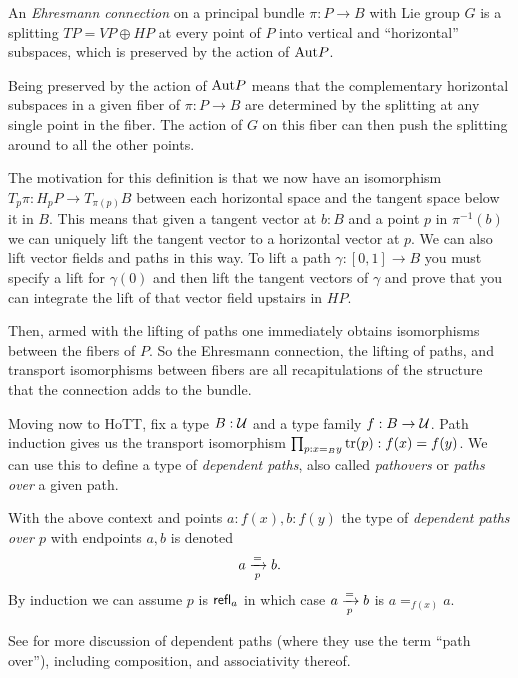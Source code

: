 \documentclass[12pt]{article}
\begin{document}
\begin{mydef}
An \emph{Ehresmann connection} on a principal bundle \( \pi:P\to B \) with Lie group \( G \) is a splitting \( TP=VP\oplus HP \) at every point of \( P \) into vertical and ``horizontal'' subspaces, which is preserved by the action of \( \mathrm{Aut} P \).
\end{mydef}

Being preserved by the action of \( \mathrm{Aut} P \) means that the complementary horizontal subspaces in a given fiber of \( \pi:P\to B \) are determined by the splitting at any single point in the fiber. The action of \( G \) on this fiber can then push the splitting around to all the other points.

The motivation for this definition is that we now have an isomorphism \( T_p\pi:H_pP\to T_{\pi(p)}B \) between each horizontal space and the tangent space below it in \( B \). This means that given a tangent vector at \( b:B \) and a point \( p \) in \( \pi^{-1}(b) \) we can uniquely lift the tangent vector to a horizontal vector at \( p \). We can also lift vector fields and paths in this way. To lift a path \( \gamma:[0,1]\to B \) you must specify a lift for \( \gamma(0) \) and then lift the tangent vectors of \( \gamma \) and prove that you can integrate the lift of that vector field upstairs in \( HP \).

Then, armed with the lifting of paths one immediately obtains isomorphisms between the fibers of \( P \). So the Ehresmann connection, the lifting of paths, and transport isomorphisms between fibers are all recapitulations of the structure that the connection adds to the bundle.

Moving now to HoTT, fix a type \( B:\mathcal{U} \) and a type family \( f:B\to\mathcal{U} \). Path induction gives us the transport isomorphism \( \prod_{p:x=_B y}\mathrm{tr}(p):f(x)=f(y) \). We can use this to define a type of \emph{dependent paths}, also called \emph{pathovers} or \emph{paths over} a given path.

\begin{mydef}
With the above context and points \( a:f(x), b:f(y) \) the type of \emph{dependent paths over \( p \)} with endpoints \( a, b \) is denoted
\[ 
 a\xrightarrow[{p}]{=}b.
\]
By induction we can assume \( p \) is \( \mathsf{refl}_a \) in which case \( a\xrightarrow[{p}]{=}b \) is \( a=_{f(x)}a \).
\end{mydef}

See \cite{Symmetry} for more discussion of dependent paths (where they use the term ``path over''), including composition, and associativity thereof.
\end{document}
